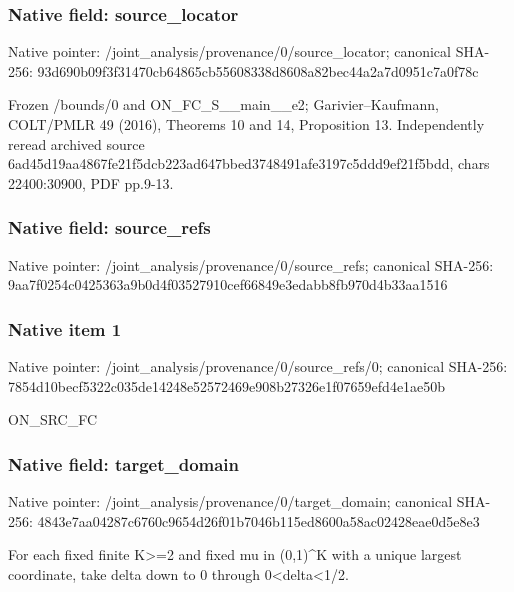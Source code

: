 \documentclass[10pt,a4paper]{article}
\begin{document}
\subsubsection{Native field: source\_\allowbreak{}locator}
Native pointer: /joint\_\allowbreak{}analysis/provenance/0/source\_\allowbreak{}locator; canonical SHA-256: 93d690b09f3f31470cb64865cb55608338d8608a82bec44a2a7d0951c7a0f78c

\begingroup\raggedright\sloppy Frozen /\allowbreak{}bounds/\allowbreak{}0 and ON\_\allowbreak{}FC\_\allowbreak{}S\_\allowbreak{}\_\allowbreak{}main\_\allowbreak{}\_\allowbreak{}e2;\allowbreak{} Garivier--Kaufmann,\allowbreak{} COLT/\allowbreak{}PMLR 49 (2016),\allowbreak{} Theorems 10 and 14,\allowbreak{} Proposition 13. Independently reread archived source 6ad45d19aa4867fe21f5dcb223ad647bbed3748491afe3197c5ddd9ef21f5bdd,\allowbreak{} chars 22400:\allowbreak{}30900,\allowbreak{} PDF pp.9-13.\par\endgroup

\subsubsection{Native field: source\_\allowbreak{}refs}
Native pointer: /joint\_\allowbreak{}analysis/provenance/0/source\_\allowbreak{}refs; canonical SHA-256: 9aa7f0254c0425363a9b0d4f03527910cef66849e3edabb8fb970d4b33aa1516

\subsubsection{Native item 1}
Native pointer: /joint\_\allowbreak{}analysis/provenance/0/source\_\allowbreak{}refs/0; canonical SHA-256: 7854d10becf5322c035de14248e52572469e908b27326e1f07659efd4e1ae50b

\begingroup\raggedright\sloppy ON\_\allowbreak{}SRC\_\allowbreak{}FC\par\endgroup

\subsubsection{Native field: target\_\allowbreak{}domain}
Native pointer: /joint\_\allowbreak{}analysis/provenance/0/target\_\allowbreak{}domain; canonical SHA-256: 4843e7aa04287c6760c9654d26f01b7046b115ed8600a58ac02428eae0d5e8e3

\begingroup\raggedright\sloppy For each fixed finite K>=\allowbreak{}2 and fixed mu in (0,\allowbreak{}1)\textasciicircum{}K with a unique largest coordinate,\allowbreak{} take delta down to 0 through 0<delta<1/\allowbreak{}2.\par\endgroup
\end{document}

